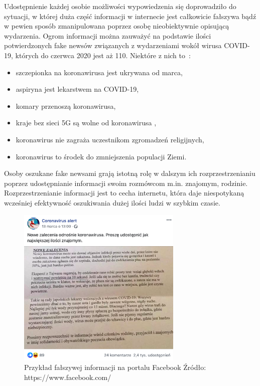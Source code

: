 Udostępnienie każdej osobie możliwości wypowiedzenia się doprowadziło do sytuacji, w której duża część informacji w internecie
jest całkowicie fałszywa bądź w pewien sposób zmanipulowana poprzez osobę nieobiektywnie opisującą wydarzenia. Ogrom informacji
można zauważyć na podstawie ilości potwierdzonych fake newsów związanych z wydarzeniami wokół wirusa COVID-19, których do 
czerwca 2020 jest aż 110. Niektóre z nich to~\cite{Korona}:
\begin{itemize}
    \item szczepionka na koronawirusa jest ukrywana od marca,
    \item aspiryna jest lekarstwem na COVID-19,
    \item komary przenoszą koronawirusa,
    \item kraje bez sieci 5G są wolne od koronawirusa ,
    \item koronawirus nie zagraża uczestnikom zgromadzeń religijnych,
    \item koronawirus to środek do zmniejszenia populacji Ziemi.
\end{itemize}
Osoby oszukane fake newsami grają istotną rolę w dalszym ich rozprzestrzenianiu poprzez udostępnianie informacji swoim rozmówcom
m.in. znajomym, rodzinie. Rozprzestrzenianie informacji jest to cecha internetu, która daje niespotykaną wcześniej efektywność oszukiwania dużej ilości ludzi w szybkim
czasie. 
\begin{figure}[h!]
    \centering
    \includegraphics[width=0.7\textwidth]{./Img/cvfakenews.png}
    \caption{Przykład fałszywej informacji na portalu Facebook Źródło: https://www.facebook.com/}
\end{figure}


